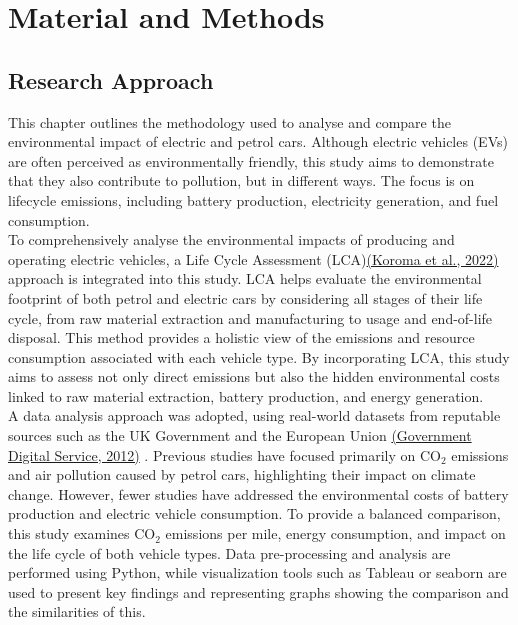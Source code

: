\chapter{Material and Methods}
\label{ch:method} %


\section{Research Approach}
This chapter outlines the methodology used to analyse and compare the environmental impact of electric and petrol cars.
 Although electric vehicles (EVs) are often perceived as environmentally friendly,
 this study aims to demonstrate that they also contribute to pollution, but in different ways.
 The focus is on lifecycle emissions, including battery production, electricity generation, and fuel consumption.\\ 

To comprehensively analyse the environmental impacts of producing and operating electric vehicles, a Life Cycle Assessment (LCA)\href{https://www.sciencedirect.com/science/article/pii/S0048969722019520}{(Koroma et al., 2022)} approach is integrated into this study. LCA  helps evaluate the environmental footprint of both petrol and electric cars by considering all stages of their life cycle, from raw material extraction and manufacturing to usage and end-of-life disposal. This method provides a holistic view of the emissions and resource consumption associated with each vehicle type. By incorporating LCA, this study aims to assess not only direct emissions but also the hidden environmental costs linked to raw material extraction, battery production, and energy generation. \\
 
 A data analysis approach was adopted, using real-world datasets from
reputable sources such as the UK Government and the European Union \href{https://www.gov.uk/co2-and-vehicle-tax-tools}{(Government Digital Service, 2012)} . Previous studies have focused primarily on CO$_2$ emissions and air pollution caused by petrol cars, highlighting their impact on climate change.
 However, fewer studies have addressed the environmental costs of battery production and electric vehicle consumption. To provide a balanced comparison, this study examines
CO$_2$ emissions per mile, energy consumption, and impact on the life cycle of both vehicle types.
Data pre-processing and analysis are performed using Python, while visualization tools such
as Tableau or seaborn are used to present key findings and representing graphs showing the comparison and 
the similarities of this. \\

